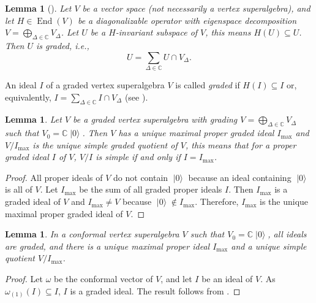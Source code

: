 \documentclass[a4paper, 12pt, reqno]{amsart}
\newtheorem{lemma}[theorem]{Lemma}
\theoremstyle{remark}
\numberwithin{equation}{subsection}
\DeclareMathOperator{\End}{End}
\DeclareMathOperator{\vac}{|0\rangle}
\begin{document}
\begin{lemma}[{\cite[Corollary 1.1]{kac_bombay_2013}}]
  \label{lmm:9}
  Let $V$ be a vector space (not necessarily a vertex superalgebra), and let $H \in \End(V)$ be a diagonalizable operator with eigenspace decomposition $V = \bigoplus_{\Delta \in \mathbb{C}}V_{\Delta}$.
  Let $U$ be a $H$-invariant subspace of $V$, this means $H(U) \subseteq U$.
  Then $U$ is graded, i.e.,
  \begin{equation*}
    U = \sum_{\Delta \in \mathbb{C}}U \cap V_{\Delta}.
  \end{equation*}
\end{lemma}

An ideal $I$ of a graded vertex superalgebra $V$ is called \emph{graded} if $H(I) \subseteq I$ or, equivalently, $I = \sum_{\Delta \in \mathbb{C}}I \cap V_{\Delta}$ (see ).

\begin{lemma}
  \label{lmm:10}
  Let $V$ be a graded vertex superalgebra with grading $V = \bigoplus_{\Delta \in \mathbb{C}}V_{\Delta}$ such that $V_0 = \mathbb{C}\vac$.
  Then $V$ has a unique maximal proper graded ideal $I_{\max}$ and $V/I_{\max}$ is the unique simple graded quotient of $V$, this means that for a proper graded ideal $I$ of $V$, $V/I$ is simple if and only if $I = I_{\max}$.
\end{lemma}

\begin{proof}
  All proper ideals of $V$ do not contain $\vac$ because an ideal containing $\vac$ is all of $V$.
  Let $I_{\max}$ be the sum of all graded proper ideals $I$.
  Then $I_{\max}$ is a graded ideal of $V$ and $I_{\max} \neq V$ because $\vac \notin I_{\max}$.
  Therefore, $I_{\max}$ is the unique maximal proper graded ideal of $V$.
\end{proof}

\begin{lemma}
  \label{lmm:11}
  In a conformal vertex superalgebra $V$ such that $V_0 = \mathbb{C}\vac$, all ideals are graded, and there is a unique maximal proper ideal $I_{\max}$ and a unique simple quotient $V/I_{\max}$.
\end{lemma}

\begin{proof}
  Let $\omega$ be the conformal vector of $V$, and let $I$ be an ideal of $V$.
  As $\omega_{(1)}(I) \subseteq I$, $I$ is a graded ideal.
  The result follows from .
\end{proof}
\end{document}
